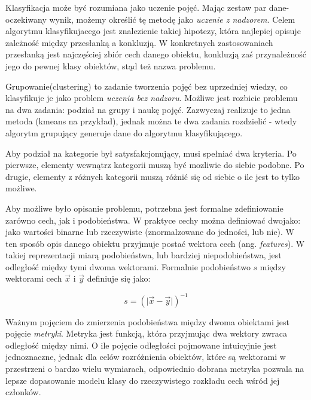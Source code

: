 \documentclass[12pt,a4paper,oneside]{report} %
\begin{document}
Klasyfikacja może być rozumiana jako uczenie pojęć. Mając zestaw par dane\--ocze\-ki\-wa\-ny wynik, możemy określić tę metodę jako \emph{uczenie z nadzorem}. Celem algorytmu klasyfikujacego jest znalezienie takiej hipotezy, która najlepiej opisuje zależność między przesłanką a konkluzją. W konkretnych zastosowaniach przesłanką jest najczęściej zbiór cech danego obiektu, konkluzją zaś przynależność jego do pewnej klasy obiektów, stąd też nazwa problemu. \par

Grupowanie(clustering) to zadanie tworzenia pojęć bez uprzedniej wiedzy, co klasyfikuje je jako problem \emph{uczenia bez nadzoru}. Możliwe jest rozbicie problemu na dwa zadania: podział na grupy i naukę pojęć. Zazwyczaj realizuje to jedna metoda (kmeans na przykład), jednak można te dwa zadania rozdzielić - wtedy algorytm grupujący generuje dane do algorytmu klasyfikującego.\par

Aby podział na kategorie był satysfakcjonujący, musi spełniać dwa kryteria. Po pierwsze, elementy wewnątrz kategorii muszą być mozliwie do siebie podobne. Po drugie, elementy z różnych kategorii muszą różnić się od siebie o ile jest to tylko możliwe.\par

Aby możliwe było opisanie problemu, potrzebna jest formalne zdefiniowanie zarówno cech, jak i podobieństwa. W praktyce cechy można definiować dwojako: jako wartości binarne lub rzeczywiste (znormalzowane do jedności, lub nie). W ten sposób opis danego obiektu przyjmuje postać wektora cech (ang. \emph{features}). W takiej reprezentacji miarą podobieństwa, lub bardziej niepodobieństwa, jest odległość między tymi dwoma wektorami. Formalnie podobieństwo $s$ między wektorami cech $\vec{x}$ i $\vec{y}$ definiuje się jako:\par

\begin{equation}
s = ( \lvert \vec{x} - \vec{y} \rvert )^{-1}
\end{equation}
\label{similarity}

Ważnym pojęciem do zmierzenia podobieństwa między dwoma obiektami jest pojęcie \emph{metryki}. Metryka jest funkcją, która przyjmując dwa wektory zwraca odległość między nimi. O ile pojęcie odległości pojmowane intuicyjnie jest jednoznaczne, jednak dla celów rozróżnienia obiektów, które są wektorami w przestrzeni o bardzo wielu wymiarach, odpowiednio dobrana metryka pozwala na lepsze dopasowanie modelu klasy do rzeczywistego rozkładu cech wśród jej członków.\par
\end{document}
